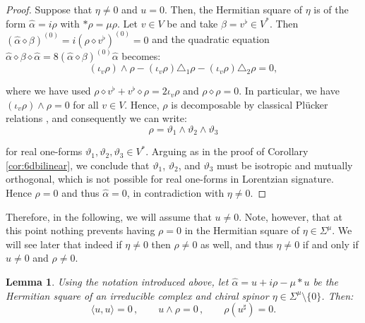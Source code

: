 \documentclass[10pt,a4paper,twoside,reqno]{amsart}
\theoremstyle{plain}
\newtheorem{lemma}[thm]{Lemma}
\theoremstyle{definition}
\theoremstyle{remark}
\newcommand{\escal}[1]{\langle#1\rangle}
\begin{document}
\begin{proof}
Suppose that $\eta\neq 0$ and $u = 0$. Then, the Hermitian square of $\eta$ is of the form $\widehat{\alpha} = i\rho$ with $\ast\rho = \mu \rho$. Let $v\in V$ be and take $\beta=v^\flat\in V^*$. Then $(\widehat{\alpha}\diamond\beta)^{(0)}=i(\rho\diamond v^\flat)^{(0)}=0$ and the quadratic equation $\widehat{\alpha} \diamond \beta \diamond\widehat{\alpha}= 8 (\widehat{\alpha}\diamond\beta)^{(0)}\widehat{\alpha}$ becomes: 
\begin{equation*}
(\iota_v\rho)\wedge\rho-(\iota_v\rho)\triangle_1\rho-(\iota_v\rho)\triangle_2\rho=0,  
\end{equation*}

\noindent
where we have used $\rho\diamond v^\flat+v^\flat\diamond\rho=2\iota_v\rho$ and $\rho\diamond\rho=0$. In particular, we have $(\iota_v\rho)\wedge\rho=0$ for all $v\in V$. Hence, $\rho$ is decomposable by classical Plücker relations \cite{EM00}, and consequently we can write:
\begin{equation*}
\rho = \vartheta_1 \wedge \vartheta_2 \wedge \vartheta_3
\end{equation*}

\noindent
for real one-forms $\vartheta_1 , \vartheta_2 , \vartheta_3 \in V^{\ast}$. Arguing as in the proof of Corollary \ref{cor:6dbilinear}, we conclude that $\vartheta_1$, $\vartheta_2$, and $\vartheta_3$ must be isotropic and mutually orthogonal, which is not possible for real one-forms in Lorentzian signature. Hence $\rho = 0$ and thus $\widehat{\alpha} = 0$, in contradiction with $\eta \neq 0$.
\end{proof}

\noindent
Therefore, in the following, we will assume that $ u \neq 0$. Note, however, that at this point nothing prevents having $\rho = 0$ in the Hermitian square of $\eta \in \Sigma^{\mu}$. We will see later that indeed if $\eta \neq 0$ then $\rho\neq 0$ as well, and thus $\eta \neq 0$ if and only if $u \neq 0$ and $\rho\neq 0$.

\begin{lemma}
Using the notation introduced above, let $\widehat{\alpha} = u + i \rho  - \mu \ast u$ be the Hermitian square of an irreducible complex and chiral spinor $\eta\in \Sigma^{\mu}\setminus \{ 0 \}$. Then:
\begin{equation*}
\escal{u,u}= 0 \, , \qquad u\wedge \rho = 0\, , \qquad \rho(u^\sharp) = 0.
\end{equation*}
\end{lemma}
\end{document}
